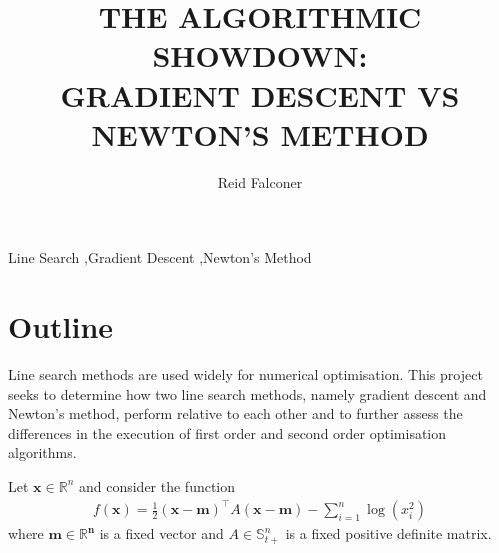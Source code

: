 \documentclass[12pt, authoryear]{elsarticle}
\begin{document}
\begin{frontmatter}  %

\title{ THE ALGORITHMIC SHOWDOWN:  \\ \vspace{0.5cm} \large 
 GRADIENT DESCENT VS NEWTON'S METHOD
}

\author[Add1]{Reid Falconer}

\address[Add1]{Barcelona Graduate School of Economics, Barcelona, Spain}




\begin{keyword}
\footnotesize{
Line Search \sep  Gradient Descent \sep Newton's Method \\ \vspace{0.3cm}
}
\end{keyword}
\vspace{0.5cm}
\end{frontmatter}

\headsep 25pt %

\section{Outline}

Line search methods are used widely for numerical optimisation. This project seeks to determine how two line search methods, namely gradient descent and Newton's method, perform relative to each other and to further assess the differences in the execution of first order and second order optimisation algorithms.

Let $\boldsymbol { x } \in \mathbb { R } ^ { n }$ and consider the function
\begin{equation}
\begin{aligned}
f ( \boldsymbol{ x} ) = \frac { 1 } { 2 } ( \boldsymbol{ x}  - \boldsymbol{ m}  ) ^ { \top } A ( \boldsymbol{ x}  - \boldsymbol{ m}  ) - \sum _ { i = 1 } ^ { n } \log \left( x _ { i } ^ { 2 } \right)
\label{function}
\end{aligned}
\end{equation}
where $\boldsymbol { m } \in \mathbb { R } ^ { \mathbf { n } }$ is a fixed vector and $A \in \mathbb { S } _ { t + } ^ { n }$ is a fixed positive definite matrix.
\end{document}
